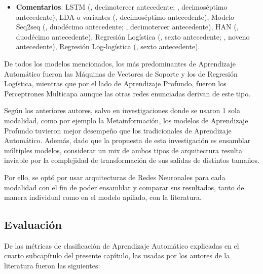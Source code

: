 \begin{itemize}
	\item \textbf{Comentarios}: LSTM (\citeauthor{pr_jin2019dayssuccess}, decimotercer antecedente; \citeauthor{pr_shafqat2019topicpredictions}, decimoséptimo antecedente), LDA o variantes (\citeauthor{pr_shafqat2019topicpredictions}, decimoséptimo antecedente), Modelo Seq2seq (\citeauthor{pr_lee2018contentDL}, duodécimo antecedente; \citeauthor{pr_jin2019dayssuccess}, decimotercer antecedente), HAN (\citeauthor{pr_lee2018contentDL}, duodécimo antecedente), Regresión Logística (\citeauthor{pr_li2016predcrowd}, sexto antecedente; \citeauthor{pr_kaur2017socmedcrowd}, noveno antecedente), Regresión Log-logística (\citeauthor{pr_li2016predcrowd}, sexto antecedente).
\end{itemize}

De todos los modelos mencionados, los más predominantes de Aprendizaje Automático fueron las Máquinas de Vectores de Soporte y los de Regresión Logística, mientras que por el lado de Aprendizaje Profundo, fueron los Perceptrones Multicapa aunque las otras redes enunciadas derivan de este tipo.

Según los anteriores autores, salvo en investigaciones donde se usaron 1 sola modalidad, como por ejemplo la Metainformación, los modelos de Aprendizaje Profundo tuvieron mejor desempeño que los tradicionales de Aprendizaje Automático. Además, dado que la propuesta de esta investigación es ensamblar múltiples modelos, considerar un mix de ambos tipos de arquitectura resulta inviable por la complejidad de transformación de sus salidas de distintos tamaños.

Por ello, se optó por usar arquitecturas de Redes Neuronales para cada modalidad con el fin de poder ensamblar y comparar sus resultados, tanto de manera individual como en el modelo apilado, con la literatura.

\subsection{Evaluación}
De las métricas de clasificación de Aprendizaje Automático explicadas en el cuarto subcapítulo del presente capítulo, las usadas por los autores de la literatura fueron las siguientes:

